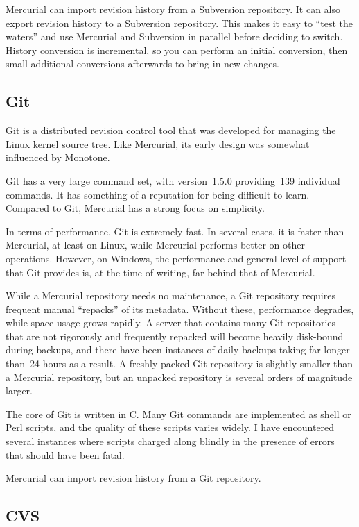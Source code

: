 Mercurial can import revision history from a Subversion repository.
It can also export revision history to a Subversion repository.  This
makes it easy to ``test the waters'' and use Mercurial and Subversion
in parallel before deciding to switch.  History conversion is
incremental, so you can perform an initial conversion, then small
additional conversions afterwards to bring in new changes.


\subsection{Git}

Git is a distributed revision control tool that was developed for
managing the Linux kernel source tree.  Like Mercurial, its early
design was somewhat influenced by Monotone.

Git has a very large command set, with version~1.5.0 providing~139
individual commands.  It has something of a reputation for being
difficult to learn.  Compared to Git, Mercurial has a strong focus on
simplicity.

In terms of performance, Git is extremely fast.  In several cases, it
is faster than Mercurial, at least on Linux, while Mercurial performs
better on other operations.  However, on Windows, the performance and
general level of support that Git provides is, at the time of writing,
far behind that of Mercurial.

While a Mercurial repository needs no maintenance, a Git repository
requires frequent manual ``repacks'' of its metadata.  Without these,
performance degrades, while space usage grows rapidly.  A server that
contains many Git repositories that are not rigorously and frequently
repacked will become heavily disk-bound during backups, and there have
been instances of daily backups taking far longer than~24 hours as a
result.  A freshly packed Git repository is slightly smaller than a
Mercurial repository, but an unpacked repository is several orders of
magnitude larger.

The core of Git is written in C.  Many Git commands are implemented as
shell or Perl scripts, and the quality of these scripts varies widely.
I have encountered several instances where scripts charged along
blindly in the presence of errors that should have been fatal.

Mercurial can import revision history from a Git repository.


\subsection{CVS}

